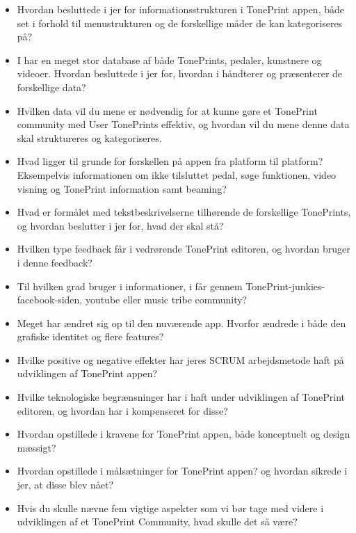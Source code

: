 \begin{itemize}
  \item Hvordan besluttede i jer for informationsstrukturen i TonePrint appen, både set i forhold til menustrukturen og de forskellige måder de kan kategoriseres på?\\
  \item I har en meget stor database af både TonePrints, pedaler, kunstnere og videoer. Hvordan besluttede i jer for,  hvordan i håndterer og præsenterer de forskellige data?\\
  \item Hvilken data vil du mene er nødvendig for at kunne gøre et TonePrint community med User TonePrints effektiv, og hvordan vil du mene denne data skal struktureres og kategoriseres.\\
  \item Hvad ligger til grunde for forskellen på appen fra platform til platform? Eksempelvis informationen om ikke tilsluttet pedal, søge funktionen, video visning og TonePrint information samt beaming?\\
  \item Hvad er formålet med tekstbeskrivelserne tilhørende de forskellige TonePrints, og hvordan beslutter i jer for, hvad der skal stå?\\
\end{itemize}

\begin{itemize}
  \item Hvilken type feedback får i vedrørende TonePrint editoren, og hvordan bruger i denne feedback?\\
  \item Til hvilken grad bruger i informationer, i får gennem TonePrint-junkies-facebook-siden, youtube eller music tribe community?\\ 
  \item Meget har ændret sig op til den nuværende app. Hvorfor ændrede i både den grafiske identitet og flere features?\\
  \item Hvilke positive og negative effekter har jeres SCRUM arbejdsmetode haft på udviklingen af TonePrint appen?\\
  \item Hvilke teknologiske begrænsninger har i haft under udviklingen af TonePrint editoren, og hvordan har i kompenseret for disse?\\
  \item Hvordan opstillede i kravene for TonePrint appen, både konceptuelt og design mæssigt?\\
  \item Hvordan opstillede i målsætninger for TonePrint appen? og hvordan sikrede i jer, at disse blev nået?\\
  \item Hvis du skulle nævne fem vigtige aspekter som vi bør tage med videre i udviklingen af et TonePrint Community, hvad skulle det så være?
\end{itemize}